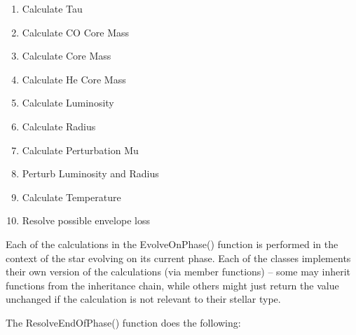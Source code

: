 \medskip
\hfill
\begin{minipage}{\dimexpr\textwidth-2em}
\begin{enumerate}
    \item  Calculate Tau
    
    \item  Calculate CO Core Mass \\
    \item  Calculate Core Mass \\
    \item  Calculate He Core Mass \\

    \item  Calculate Luminosity \\
    \item  Calculate Radius

    \item  Calculate Perturbation Mu \\
    \item  Perturb Luminosity and Radius

    \item  Calculate Temperature

    \item  Resolve possible envelope loss
\end{enumerate}
\end{minipage}

\bigskip
Each of the calculations in the EvolveOnPhase() function is performed in the context of the star evolving on its current phase.  Each of the classes implements their own version of the calculations (via member functions) -- some may inherit functions from the inheritance chain, while others might just return the value unchanged if the calculation is not relevant to their stellar type.

\newpage
The ResolveEndOfPhase() function does the following:

